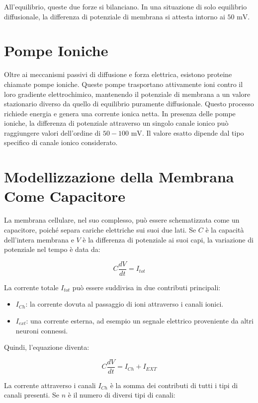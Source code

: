 All'equilibrio, queste due forze si bilanciano. In una situazione di solo equilibrio diffusionale, la differenza di potenziale di membrana si attesta intorno ai $50 \text{ mV}$.


\section{Pompe Ioniche}
Oltre ai meccanismi passivi di diffusione e forza elettrica, esistono proteine chiamate pompe ioniche. Queste pompe trasportano attivamente ioni contro il loro gradiente elettrochimico, mantenendo il potenziale di membrana a un valore stazionario diverso da quello di equilibrio puramente diffusionale. Questo processo richiede energia e genera una corrente ionica netta. In presenza delle pompe ioniche, la differenza di potenziale attraverso un singolo canale ionico può raggiungere valori dell'ordine di $50-100 \text{ mV}$. Il valore esatto dipende dal tipo specifico di canale ionico considerato.


\section{Modellizzazione della Membrana Come Capacitore}
La membrana cellulare, nel suo complesso, può essere schematizzata come un capacitore, poiché separa cariche elettriche sui suoi due lati. Se $C$ è la capacità dell'intera membrana e $V$ è la differenza di potenziale ai suoi capi, la variazione di potenziale nel tempo è data da:

\begin{equation} \label{eq:ch20_1}
C\frac{dV}{dt} = I_{tot}
\end{equation}

La corrente totale $I_{tot}$ può essere suddivisa in due contributi principali:
\begin{itemize}
    \item $I_{Ch}$: la corrente dovuta al passaggio di ioni attraverso i canali ionici.
    \item $I_{ext}$: una corrente esterna, ad esempio un segnale elettrico proveniente da altri neuroni connessi.
\end{itemize}

Quindi, l'equazione diventa:

\begin{equation} \label{eq:ch20_2}
C\frac{dV}{dt} = I_{Ch} + I_{EXT}
\end{equation}

La corrente attraverso i canali $I_{Ch}$ è la somma dei contributi di tutti i tipi di canali presenti. Se $n$ è il numero di diversi tipi di canali:

